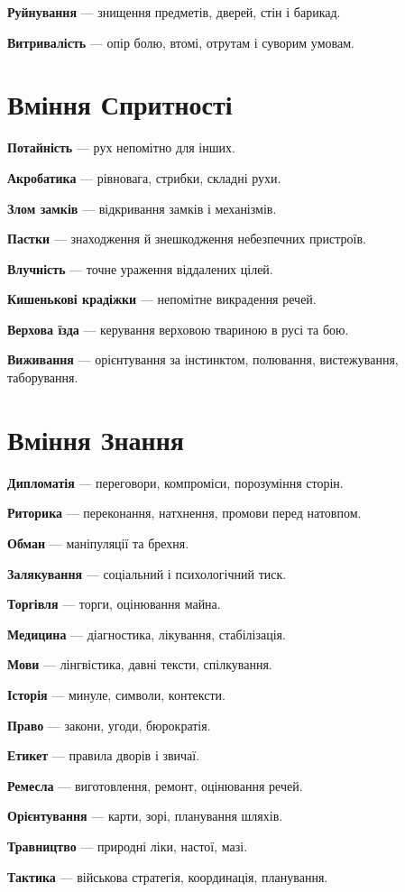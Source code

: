 \documentclass[10pt,a4paper]{article}
\begin{document}
\textbf{Руйнування} — знищення предметів, дверей, стін і барикад.

\textbf{Витривалість} — опір болю, втомі, отрутам і суворим умовам.
\section*{Вміння Спритності}
\textbf{Потайність} — рух непомітно для інших.

\textbf{Акробатика} — рівновага, стрибки, складні рухи.

\textbf{Злом замків} — відкривання замків і механізмів.

\textbf{Пастки} — знаходження й знешкодження небезпечних пристроїв.

\textbf{Влучність} — точне ураження віддалених цілей.

\textbf{Кишенькові крадіжки} — непомітне викрадення речей.

\textbf{Верхова їзда} — керування верховою твариною в русі та бою.

\textbf{Виживання} — орієнтування за інстинктом, полювання, вистежування, таборування.
\section*{Вміння Знання}
\textbf{Дипломатія} — переговори, компроміси, порозуміння сторін.

\textbf{Риторика} — переконання, натхнення, промови перед натовпом.

\textbf{Обман} — маніпуляції та брехня.

\textbf{Залякування} — соціальний і психологічний тиск.

\textbf{Торгівля} — торги, оцінювання майна.

\textbf{Медицина} — діагностика, лікування, стабілізація.

\textbf{Мови} — лінгвістика, давні тексти, спілкування.

\textbf{Історія} — минуле, символи, контексти.

\textbf{Право} — закони, угоди, бюрократія.

\textbf{Етикет} — правила дворів і звичаї.

\textbf{Ремесла} — виготовлення, ремонт, оцінювання речей.

\textbf{Орієнтування} — карти, зорі, планування шляхів.

\textbf{Травництво} — природні ліки, настої, мазі.

\textbf{Тактика} — військова стратегія, координація, планування.
\end{document}
